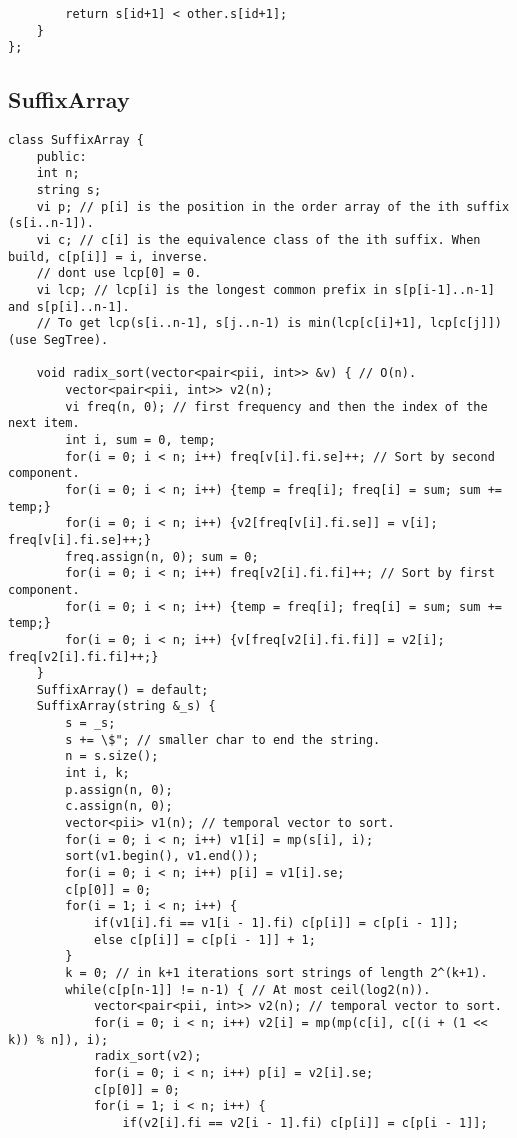 \documentclass[a4paper]{article}
\begin{document}
\begin{verbatim}
        return s[id+1] < other.s[id+1];
    }
};
\end{verbatim}
\subsection*{SuffixArray}
\begin{verbatim}
class SuffixArray {
    public:
    int n;
    string s;
    vi p; // p[i] is the position in the order array of the ith suffix (s[i..n-1]).
    vi c; // c[i] is the equivalence class of the ith suffix. When build, c[p[i]] = i, inverse.
    // dont use lcp[0] = 0.
    vi lcp; // lcp[i] is the longest common prefix in s[p[i-1]..n-1] and s[p[i]..n-1].
    // To get lcp(s[i..n-1], s[j..n-1) is min(lcp[c[i]+1], lcp[c[j]]) (use SegTree).

    void radix_sort(vector<pair<pii, int>> &v) { // O(n).
        vector<pair<pii, int>> v2(n);
        vi freq(n, 0); // first frequency and then the index of the next item.
        int i, sum = 0, temp;
        for(i = 0; i < n; i++) freq[v[i].fi.se]++; // Sort by second component.
        for(i = 0; i < n; i++) {temp = freq[i]; freq[i] = sum; sum += temp;}
        for(i = 0; i < n; i++) {v2[freq[v[i].fi.se]] = v[i]; freq[v[i].fi.se]++;}
        freq.assign(n, 0); sum = 0;
        for(i = 0; i < n; i++) freq[v2[i].fi.fi]++; // Sort by first component.
        for(i = 0; i < n; i++) {temp = freq[i]; freq[i] = sum; sum += temp;}
        for(i = 0; i < n; i++) {v[freq[v2[i].fi.fi]] = v2[i]; freq[v2[i].fi.fi]++;}
    }
    SuffixArray() = default;
    SuffixArray(string &_s) {
        s = _s;
        s += \$"; // smaller char to end the string.
        n = s.size();
        int i, k;
        p.assign(n, 0);
        c.assign(n, 0);
        vector<pii> v1(n); // temporal vector to sort.
        for(i = 0; i < n; i++) v1[i] = mp(s[i], i);
        sort(v1.begin(), v1.end());
        for(i = 0; i < n; i++) p[i] = v1[i].se;
        c[p[0]] = 0;
        for(i = 1; i < n; i++) {
            if(v1[i].fi == v1[i - 1].fi) c[p[i]] = c[p[i - 1]];
            else c[p[i]] = c[p[i - 1]] + 1;
        }
        k = 0; // in k+1 iterations sort strings of length 2^(k+1).
        while(c[p[n-1]] != n-1) { // At most ceil(log2(n)). 
            vector<pair<pii, int>> v2(n); // temporal vector to sort.
            for(i = 0; i < n; i++) v2[i] = mp(mp(c[i], c[(i + (1 << k)) % n]), i);
            radix_sort(v2);
            for(i = 0; i < n; i++) p[i] = v2[i].se;
            c[p[0]] = 0;
            for(i = 1; i < n; i++) {
                if(v2[i].fi == v2[i - 1].fi) c[p[i]] = c[p[i - 1]];

\end{verbatim}
\end{document}
